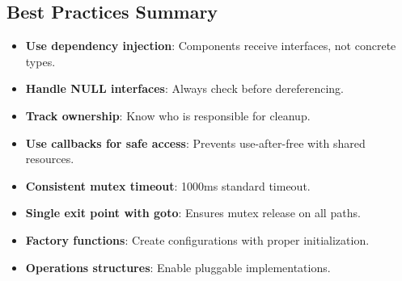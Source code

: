 \subsection{Best Practices Summary}

\begin{itemize}
    \item \textbf{Use dependency injection}: Components receive interfaces, not concrete types.
    \item \textbf{Handle NULL interfaces}: Always check before dereferencing.
    \item \textbf{Track ownership}: Know who is responsible for cleanup.
    \item \textbf{Use callbacks for safe access}: Prevents use-after-free with shared resources.
    \item \textbf{Consistent mutex timeout}: 1000ms standard timeout.
    \item \textbf{Single exit point with goto}: Ensures mutex release on all paths.
    \item \textbf{Factory functions}: Create configurations with proper initialization.
    \item \textbf{Operations structures}: Enable pluggable implementations.
\end{itemize}

